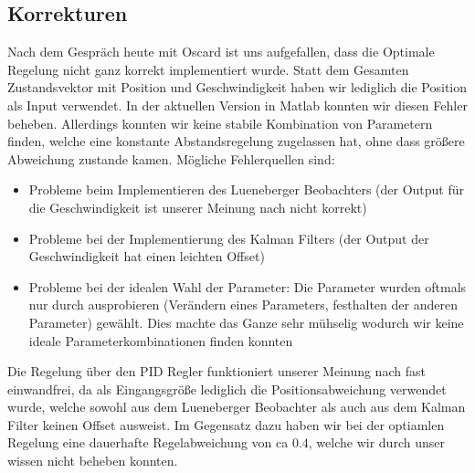 \subsection{Korrekturen}
Nach dem Gespräch heute mit Oscard ist uns aufgefallen, dass die Optimale
Regelung nicht ganz korrekt implementiert wurde. Statt dem Gesamten
Zustandsvektor mit Position und Geschwindigkeit haben wir lediglich die
Position als Input verwendet. In der aktuellen Version in Matlab konnten
wir diesen Fehler beheben. Allerdings konnten wir keine stabile Kombination von
Parametern finden, welche eine konstante Abstandsregelung zugelassen hat, ohne
dass größere Abweichung zustande kamen. Mögliche Fehlerquellen sind:
\begin{itemize}
    \item Probleme beim Implementieren des Lueneberger Beobachters (der Output
        für die Geschwindigkeit ist unserer Meinung nach nicht korrekt)
    \item Probleme bei der Implementierung des Kalman Filters (der Output der
        Geschwindigkeit hat einen leichten Offset)
    \item Probleme bei der idealen Wahl der Parameter: Die Parameter wurden
        oftmals nur durch ausprobieren (Verändern eines Parameters, festhalten
        der anderen Parameter) gewählt. Dies machte das Ganze sehr mühselig
        wodurch wir keine ideale Parameterkombinationen finden konnten
\end{itemize}
Die Regelung über den PID Regler funktioniert unserer Meinung nach
fast einwandfrei, da als Eingangsgröße lediglich die Positionsabweichung
verwendet wurde, welche sowohl aus dem Lueneberger Beobachter als auch aus dem
Kalman Filter keinen Offset ausweist. Im Gegensatz dazu haben wir bei der
optiamlen Regelung eine dauerhafte Regelabweichung von ca $0.4$, welche wir
durch unser wissen nicht beheben konnten.
